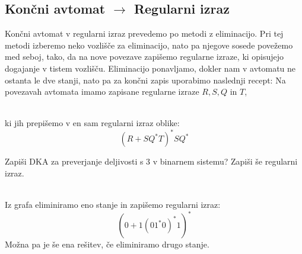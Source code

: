 \documentclass[10pt,a4paper,oneside]{book}
\begin{document}
\subsection{Končni avtomat $\rightarrow$ Regularni izraz}\label{KA-RI}
Končni avtomat v regularni izraz prevedemo po metodi z eliminacijo. Pri tej metodi izberemo neko vozlišče za eliminacijo, nato pa njegove sosede povežemo med seboj, tako, da na nove povezave zapišemo regularne izraze, ki opisujejo dogajanje v tistem vozlišču. Eliminacijo ponavljamo, dokler nam v avtomatu ne ostanta le dve stanji, nato pa za končni zapis uporabimo naslednji recept:
\br
Na povezavah avtomata imamo zapisane regularne izraze $R,S,Q$ in $T$,\\
\\
ki jih prepišemo v en sam regularni izraz oblike:
\[ (R+SQ^*T)^*SQ^* \]

\begin{primeri}
\item Zapiši DKA za preverjanje deljivosti s 3 v binarnem sistemu? Zapiši še regularni izraz.\\
\ \\
Iz grafa eliminiramo eno stanje in zapišemo regularni izraz:
\[ (0+1(01^*0)^*1)^* \]
Možna pa je še ena rešitev, če eliminiramo drugo stanje.%
\end{primeri}
\end{document}
